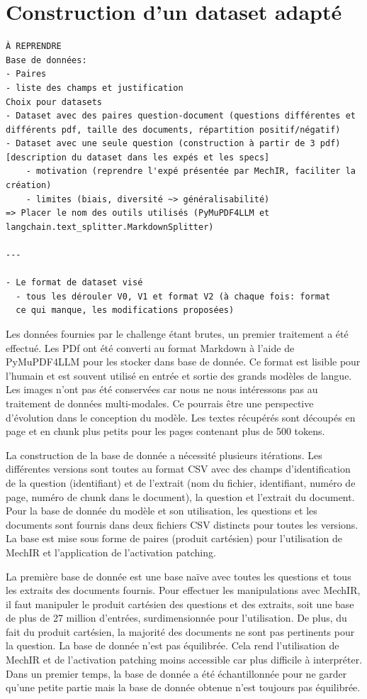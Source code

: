 \section{Construction d'un dataset adapté}
    \begin{verbatim}
À REPRENDRE
Base de données:        
- Paires 
- liste des champs et justification
Choix pour datasets
- Dataset avec des paires question-document (questions différentes et 
différents pdf, taille des documents, répartition positif/négatif)
- Dataset avec une seule question (construction à partir de 3 pdf) 
[description du dataset dans les expés et les specs]
    - motivation (reprendre l'expé présentée par MechIR, faciliter la création)
    - limites (biais, diversité ~> généralisabilité)
=> Placer le nom des outils utilisés (PyMuPDF4LLM et langchain.text_splitter.MarkdownSplitter)

---

- Le format de dataset visé
  - tous les dérouler V0, V1 et format V2 (à chaque fois: format
  ce qui manque, les modifications proposées)
    \end{verbatim}

    Les données fournies par le challenge étant brutes, un premier traitement a été effectué. Les PDf ont été converti au format Markdown à l'aide de PyMuPDF4LLM \cite{artifex_software_pymupdf4llm_2026} pour les stocker dans base de donnée. Ce format est lisible pour l'humain et est souvent utilisé en entrée et sortie des grands modèles de langue. Les images n'ont pas été conservées car nous ne nous intéressons pas au traitement de données multi-modales. Ce pourrais être une perspective d'évolution dans le conception du modèle.  Les textes récupérés sont découpés en page et en chunk plus petits pour les pages contenant plus de 500 tokens.

    La construction de la base de donnée a nécessité plusieurs itérations. Les différentes versions sont toutes au format CSV avec des champs d'identification de la question (identifiant) et de l'extrait (nom du fichier, identifiant, numéro de page, numéro de chunk dans le document), la question et l'extrait du document. Pour la base de donnée du modèle et son utilisation, les questions et les documents sont fournis dans deux fichiers CSV distincts pour toutes les versions. La base est mise sous forme de paires (produit cartésien) pour l'utilisation de MechIR et l'application de l'activation patching.

    La première base de donnée est une base naïve avec toutes les questions et tous les extraits des documents fournis. Pour effectuer les manipulations avec MechIR, il faut manipuler le produit cartésien des questions et des extraits, soit une base de plus de 27 million d'entrées, surdimensionnée pour l'utilisation. De plus, du fait du produit cartésien, la majorité des documents ne sont pas pertinents pour la question. La base de donnée n'est pas équilibrée. Cela rend l'utilisation de MechIR et de l'activation patching moins accessible car plus difficile à interpréter. Dans un premier temps, la base de donnée a été échantillonnée pour ne garder qu'une petite partie mais la base de donnée obtenue n'est toujours pas équilibrée. 

